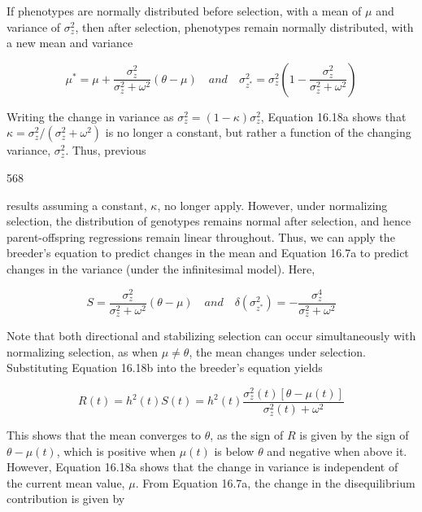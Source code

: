 \documentclass{article}
\begin{document}
If phenotypes are normally distributed before selection, with a mean of  $ \mu $ and variance of  $ \sigma_{z}^{2} $, then after selection, phenotypes remain normally distributed, with a new mean and variance

\begin{equation}
\mu^{*}=\mu+\frac{\sigma_{z}^{2}}{\sigma_{z}^{2}+\omega^{2}}(\theta-\mu)\quad and\quad\sigma_{z^{*}}^{2}=\sigma_{z}^{2}\left(1-\frac{\sigma_{z}^{2}}{\sigma_{z}^{2}+\omega^{2}}\right)
\tag{16.18a}
\label{eq:16_18a}
\end{equation}

Writing the change in variance as  $ \sigma_{z}^{2} = (1 - \kappa) \sigma_{z}^{2} $, Equation 16.18a shows that  $ \kappa = \sigma_{z}^{2} / (\sigma_{z}^{2} + \omega^{2}) $ is no longer a constant, but rather a function of the changing variance,  $ \sigma_{z}^{2} $. Thus, previous

568

results assuming a constant,  $ \kappa $, no longer apply. However, under normalizing selection, the distribution of genotypes remains normal after selection, and hence parent-offspring regressions remain linear throughout. Thus, we can apply the breeder's equation to predict changes in the mean and Equation 16.7a to predict changes in the variance (under the infinitesimal model). Here,

\begin{equation}
S=\frac{\sigma_{z}^{2}}{\sigma_{z}^{2}+\omega^{2}}(\theta-\mu)\quad and\quad\delta\left(\sigma_{z^{*}}^{2}\right)=-\frac{\sigma_{z}^{4}}{\sigma_{z}^{2}+\omega^{2}}
\tag{16.18b}
\label{eq:16_18b}
\end{equation}

Note that both directional and stabilizing selection can occur simultaneously with normalizing selection, as when  $ \mu \neq \theta $, the mean changes under selection. Substituting Equation 16.18b into the breeder's equation yields

\begin{equation}
R(t)=h^{2}(t)S(t)=h^{2}(t)\frac{\sigma_{z}^{2}(t)\left[\theta-\mu(t)\right]}{\sigma_{z}^{2}(t)+\omega^{2}}
\tag{16.19}
\label{eq:16_19}
\end{equation}

This shows that the mean converges to  $ \theta $, as the sign of  $ R $ is given by the sign of  $ \theta - \mu(t) $, which is positive when  $ \mu(t) $ is below  $ \theta $ and negative when above it. However, Equation 16.18a shows that the change in variance is independent of the current mean value,  $ \mu $. From Equation 16.7a, the change in the disequilibrium contribution is given by
\end{document}
